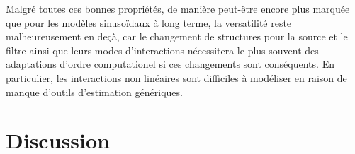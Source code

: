 
Malgré toutes ces bonnes propriétés, de manière peut-être encore plus marquée que pour les modèles sinusoïdaux à long terme, la versatilité reste malheureusement en deçà, car le changement de structures pour la source et le filtre ainsi que leurs modes d'interactions nécessitera le plus souvent des adaptations d'ordre computationel si ces changements sont conséquents. En particulier, les interactions non linéaires sont difficiles à modéliser en raison de manque d'outils d'estimation génériques.


\section{ \nmu Discussion}

